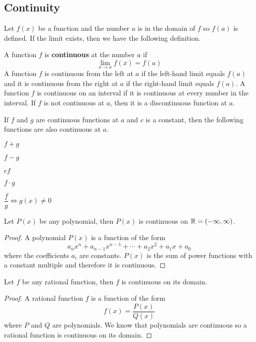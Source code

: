 \subsection{Continuity}
Let \(f(x)\) be a function and the number \(a\) is in the domain of \(f\) so
\(f(a)\) is defined.
If the limit exists, then we have the following definition.
\begin{definition}
    A function \(f\) is \textbf{continuous} at the number \(a\) if
    \[\lim_{x\to a}f(x)=f(a)\]
    A function \(f\) is continuous from the left at \(a\) if the left-hand limit
    equals \(f(a)\) and it is continuous from the right at \(a\) if the right-hand
    limit equals \(f(a)\).
    A function \(f\) is continuous on an interval if it is continuous
    at every number in the interval.
    If \(f\) is not continuous at \(a\), then it is a discontinuous function at \(a\).
\end{definition}
\begin{theorem}
    If \(f\) and \(g\) are continuous functions at \(a\) and \(c\) is a constant,
    then the following functions are also continuous at \(a\). \\
    \begin{itemize*}
        \item \(f+g\) \item \(f-g\) \item \(cf\) \item \(f\cdot g\)
        \item \(\dfrac{f}{g}\iff g(x)\neq 0\)
    \end{itemize*}
\end{theorem}
\begin{theorem}
    Let \(P(x)\) be any polynomial, then \(P(x)\) is continuous on
    \(\mathbb{R}=(-\infty,\infty)\).
\end{theorem}
\begin{proof}
    A polynomial \(P(x)\) is a function of the form
    \[a_nx^n+a_{n-1}x^{n-1}+\dotsb +a_{2}x^{2}+a_1x+a_0\]
    where the coefficients \(a_i\) are constants.
    \(P(x)\) is the sum of power functions with a constant multiple and
    therefore it is continuous.
\end{proof}
\begin{theorem}
    Let \(f\) be any rational function, then \(f\) is continuous on its domain.
\end{theorem}
\begin{proof}
    A rational function \(f\) is a function of the form
    \[f(x)=\frac{P(x)}{Q(x)}\] where \(P\) and \(Q\) are polynomials.
    We know that polynomials are continuous so a rational function is
    continuous on its domain.
\end{proof}
